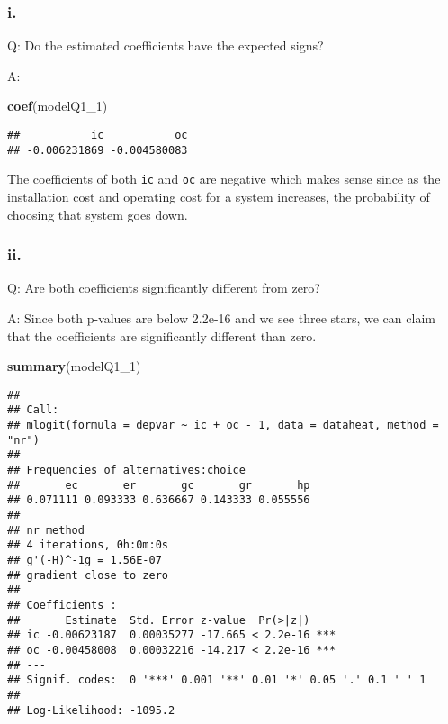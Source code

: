 \documentclass[
]{article}
\newenvironment{Shaded}{\begin{snugshade}}{\end{snugshade}}
\newcommand{\DecValTok}[1]{\textcolor[rgb]{0.00,0.00,0.81}{#1}}
\newcommand{\KeywordTok}[1]{\textcolor[rgb]{0.13,0.29,0.53}{\textbf{#1}}}
\newcommand{\NormalTok}[1]{#1}
\begin{document}

\hypertarget{i.}{%
\subsubsection{i.}\label{i.}}

Q: Do the estimated coefficients have the expected signs?

A:

\begin{Shaded}
\begin{Highlighting}[]
\KeywordTok{coef}\NormalTok{(modelQ1_}\DecValTok{1}\NormalTok{)}
\end{Highlighting}
\end{Shaded}

\begin{verbatim}
##           ic           oc 
## -0.006231869 -0.004580083
\end{verbatim}

The coefficients of both \texttt{ic} and \texttt{oc} are negative which
makes sense since as the installation cost and operating cost for a
system increases, the probability of choosing that system goes down.

\hypertarget{ii.}{%
\subsubsection{ii.}\label{ii.}}

Q: Are both coefficients significantly different from zero?

A: Since both p-values are below 2.2e-16 and we see three stars, we can
claim that the coefficients are significantly different than zero.

\begin{Shaded}
\begin{Highlighting}[]
\KeywordTok{summary}\NormalTok{(modelQ1_}\DecValTok{1}\NormalTok{)}
\end{Highlighting}
\end{Shaded}

\begin{verbatim}
## 
## Call:
## mlogit(formula = depvar ~ ic + oc - 1, data = dataheat, method = "nr")
## 
## Frequencies of alternatives:choice
##       ec       er       gc       gr       hp 
## 0.071111 0.093333 0.636667 0.143333 0.055556 
## 
## nr method
## 4 iterations, 0h:0m:0s 
## g'(-H)^-1g = 1.56E-07 
## gradient close to zero 
## 
## Coefficients :
##       Estimate  Std. Error z-value  Pr(>|z|)    
## ic -0.00623187  0.00035277 -17.665 < 2.2e-16 ***
## oc -0.00458008  0.00032216 -14.217 < 2.2e-16 ***
## ---
## Signif. codes:  0 '***' 0.001 '**' 0.01 '*' 0.05 '.' 0.1 ' ' 1
## 
## Log-Likelihood: -1095.2
\end{verbatim}
\end{document}
